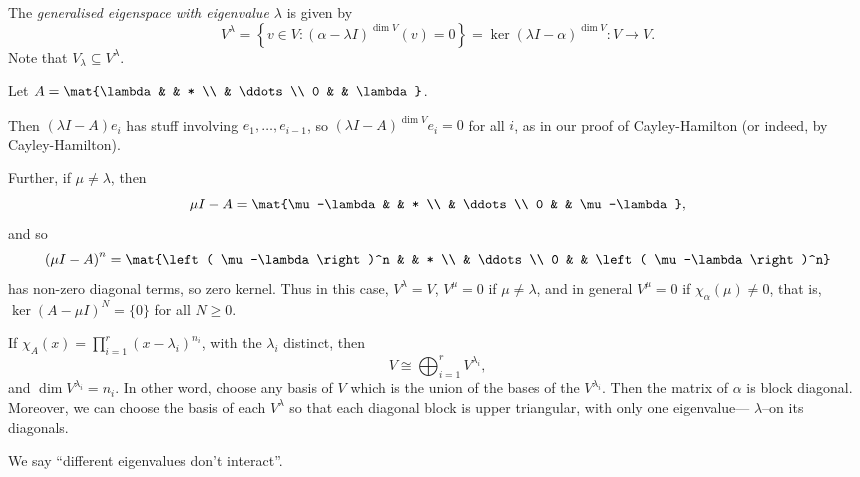 \begin{definition}
	The \emph{generalised eigenspace with eigenvalue $\lambda$} is given by
	\begin{equation*}
		  V^\lambda
		= \left\{v\in V : \left( \alpha-\lambda I \right)^{\dim V}(v)=0\right\}
		= \ker\left( \lambda I-\alpha \right)^{\dim V}
		: V \to V.
	\end{equation*}
	Note that $V_\lambda \subseteq V^\lambda$.
\end{definition}

\begin{example}
	Let $A=\mat{\lambda & & * \\ & \ddots \\ 0 & & \lambda}$. %
	
	Then $\left( \lambda I-A \right)e_i$ has stuff involving $e_1,\ldots,e_{i-1}$, so $\left( \lambda I-A \right)^{\dim V} e_i=0$ for all $i$, as in our proof of Cayley-Hamilton (or indeed, by Cayley-Hamilton). %
	
	Further, if $\mu\neq \lambda$, then
	\begin{equation*}
		\mu I-A = \mat{\mu-\lambda & & * \\ & \ddots \\ 0 & & \mu-\lambda},
	\end{equation*}
	and so
	\begin{equation*}
		\left( \mu I-A \right)^n = \mat{\left( \mu-\lambda \right)^n & & * \\ & \ddots \\ 0 & & \left( \mu-\lambda \right)^n} %
	\end{equation*}
	has non-zero diagonal terms, so zero kernel. Thus in this case, $V^\lambda=V$, $V^\mu = 0$ if $\mu\neq \lambda$, and in general $V^\mu=0$ if $\chi_\alpha(\mu)\neq 0$, that is, $\ker\left( A-\mu I \right)^N = \{0\}$ for all $N\geq 0$. %
\end{example}


\begin{theorem}
	If $\chi_A(x)=\prod_{i=1}^r \left( x-\lambda_i \right)^{n_i}$, with the $\lambda_i$ distinct, then %
	\begin{equation*}
		V \cong \bigoplus_{i=1}^r  V^{\lambda_i},
	\end{equation*}
	and $\dim V^{\lambda_i}=n_i$. In other word, choose any basis of $V$ which is the union of the bases of the $V^{\lambda_i}$. Then the matrix of $\alpha$ is block diagonal. Moreover, we can choose the basis of each $V^\lambda$ so that each diagonal block is upper triangular, with only one eigenvalue--- $\lambda$--on its diagonals. %
	
	We say ``different eigenvalues don't interact''.
\end{theorem}

